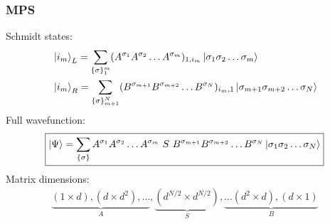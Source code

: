 \documentclass{beamer}
\theoremstyle{definition}
\begin{document}
\begin{frame}
	\frametitle{MPS}
	Schmidt states:
	\begin{align*}
		&\ket{i_m}_L = \sum_{\{\sigma\}_1^m} (A^{\sigma_1}A^{\sigma_2}\dots A^{\sigma_m})_{1,i_m}  \ket{\sigma_1 \sigma_2\dots\sigma_m} \\
		&\ket{i_m}_R = \sum_{\{\sigma\}_{m+1}^N} (B^{\sigma_{m+1}}B^{\sigma_{m+2}}\dots B^{\sigma_N})_{i_m,1}  \ket{\sigma_{m+1}\sigma_{m+2}\dots\sigma_N} 
	\end{align*}
	\pause
	Full wavefunction:
	\begin{align*}
		\boxed{\ket{\Psi} = \sum_{\{\sigma\}}    A^{\sigma_1}A^{\sigma_2}\dots A^{\sigma_m}  \,\,{S}\,\, B^{\sigma_{m+1}}B^{\sigma_{m+2}}\dots B^{\sigma_N}  \ket{\sigma_1\sigma_2\dots \sigma_N}}
	\end{align*}
	Matrix dimensions:
	\begin{align*}
		\underbrace{(1\times d), (d\times d^2), \dots }_{A}, \underbrace{(d^{N/2}\times d^{N/2})}_{S},  \underbrace{\dots (d^2\times d), (d\times 1)}_{B}
	\end{align*}


\end{frame}
\end{document}
